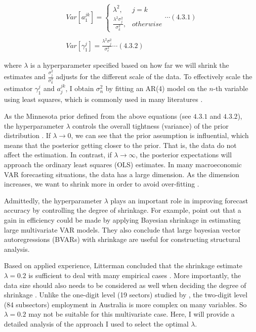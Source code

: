 \documentclass{monashthesis}
\begin{document}
\[
\begin{aligned}
&Var[a_1^{jk}]= 
\begin{cases}
\lambda^2,&j=k\\
\frac{\lambda^2\sigma^2_{j}}{\sigma^2_k},& otherwise
\end{cases}\cdots(4.3.1)\\
\\
&Var[\gamma_1^{j}]=\frac{\lambda^2\sigma^2_{j}}{\sigma^2_e}\cdots(4.3.2)
\end{aligned}
\]

where \(\lambda\) is a hyperparameter specified based on how far we will shrink the estimates and \(\frac{\sigma^2_{j}}{\sigma^2_k}\) adjusts for the different scale of the data. To effectively scale the estimator \(\gamma^j_1\) and \(a_j^{jk}\), I obtain \(\sigma_n^2\) by fitting an AR(4) model on the \(n\)-th variable using least squares, which is commonly used in many literatures \autocite{anderson2020,banbura2010large,koop2013}.

As the Minnesota prior defined from the above equations (see \(4.3.1\) and \(4.3.2\)), the hyperparameter \(\lambda\) controls the overall tightness (variance) of the prior distribution \autocite{banbura2010large}. If \(\lambda\rightarrow0\), we can see that the prior assumption is influential, which means that the posterior getting closer to the prior. That is, the data do not affect the estimation. In contrast, if \(\lambda\rightarrow\infty\), the posterior expectations will approach the ordinary least squares (OLS) estimates. In many macroeconomic VAR forecasting situations, the data has a large dimension. As the dimension increases, we want to shrink more in order to avoid over-fitting \autocite{de2008}.

Admittedly, the hyperparameter \(\lambda\) plays an important role in improving forecast accuracy by controlling the degree of shrinkage. For example, \textcite{banbura2010large} point out that a gain in efficiency could be made by applying Bayesian shrinkage in estimating large multivariate VAR models. They also conclude that large bayesian vector autoregressions (BVARs) with shrinkage are useful for constructing structural analysis.

Based on applied experience, Litterman concluded that the shrinkage estimate \(\lambda=0.2\) is sufficient to deal with many empirical cases \autocite{litterman1986}. More importantly, the data size should also needs to be considered as well when deciding the degree of shrinkage \autocite{banbura2010large}. Unlike the one-digit level (19 sectors) studied by \textcite{anderson2020}, the two-digit level (84 subsectors) employment in Australia is more complex on many variables. So \(\lambda=0.2\) may not be suitable for this multivariate case. Here, I will provide a detailed analysis of the approach I used to select the optimal \(\lambda\).
\end{document}
